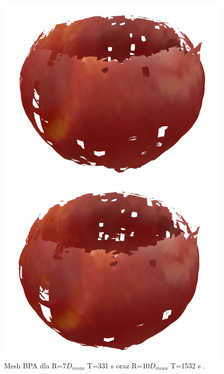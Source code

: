\begin{figure}[H]
\centering
    \begin{minipage}[b]{0.45\linewidth}
        \includegraphics[scale=0.3]{bpaApple7x.PNG}
    \end{minipage}
\quad
    \begin{minipage}[b]{0.45\linewidth}
        \includegraphics[scale=0.3]{bpaApple10x.PNG}
    \end{minipage}
\caption{Mesh BPA dla R=7$D_{mean}$ T=331 s oraz R=10$D_{mean}$ T=1532 s .}
\label{fig:appleComparison2}
\end{figure}

